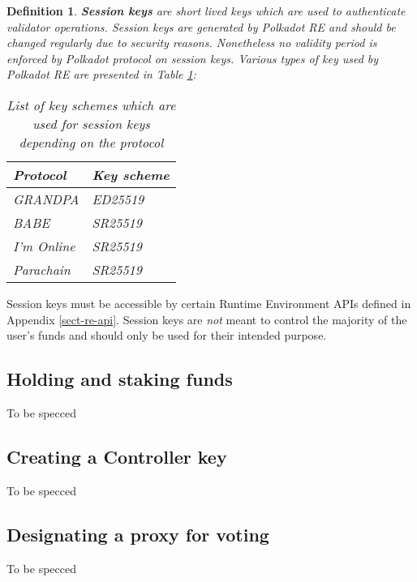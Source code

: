 \documentclass{book}
\newcommand{\tmem}[1]{{\em #1\/}}
\newcommand{\tmstrong}[1]{\textbf{#1}}
\newcommand{\tmtextbf}[1]{{\bfseries{#1}}}
\newcommand{\tmtextit}[1]{{\itshape{#1}}}
\newtheorem{definition}{Definition}
\providecommand{\tmem}[1]{\tmtextit{#1}}
\providecommand{\tmstrong}[1]{\tmtextbf{#1}}
\providecommand{\tmtextbf}[1]{\tmtextbf{#1}}
\providecommand{\tmtextit}[1]{\tmtextit{#1}}
\newtheorem{definition}{Definition}
\begin{document}
\begin{definition}
  {\tmstrong{Session keys}} are short lived keys which are used to
  authenticate validator operations. Session keys are generated by Polkadot RE
  and should be changed regularly due to security reasons. Nonetheless no
  validity period is enforced by Polkadot protocol on session keys. Various
  types of key used by Polkadot RE are presented in Table
  \ref{tabl-session-keys}{\tmem{:}}
  
  \begin{table}[h]
    \begin{tabular}{ll}
      \hline
      Protocol & Key scheme\\
      \hline
      GRANDPA & ED25519\\
      BABE & SR25519\\
      I'm Online & SR25519\\
      Parachain & SR25519\\
      \hline
    \end{tabular}
    \caption{\label{tabl-session-keys}List of key schemes which are used for
    session keys depending on the protocol}
  \end{table}
\end{definition}

Session keys must be accessible by certain Runtime Environment APIs defined in
Appendix \ref{sect-re-api}. Session keys are {\tmem{not}} meant to control the
majority of the user's funds and should only be used for their intended
purpose. {}

\subsection{Holding and staking funds}

\label{desc-staking-funds}To be specced

\subsection{Creating a Controller key}

\label{desc-creating-controller-key}To be specced

\subsection{Designating a proxy for voting}

\label{desc-designating-proxy}To be specced
\end{document}

